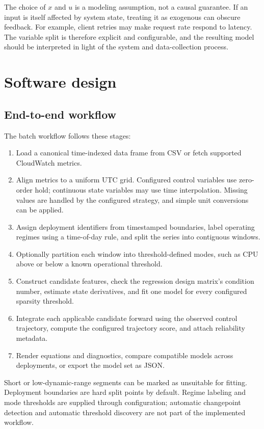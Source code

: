 \documentclass[11pt]{article}
\begin{document}
The choice of $x$ and $u$ is a modeling assumption, not a causal guarantee. If an input is itself affected by system state, treating it as exogenous can obscure feedback. For example, client retries may make request rate respond to latency. The variable split is therefore explicit and configurable, and the resulting model should be interpreted in light of the system and data-collection process.

\section{Software design}

\subsection{End-to-end workflow}

The batch workflow follows these stages:
\begin{enumerate}
  \item Load a canonical time-indexed data frame from CSV or fetch supported CloudWatch metrics.
  \item Align metrics to a uniform UTC grid. Configured control variables use zero-order hold; continuous state variables may use time interpolation. Missing values are handled by the configured strategy, and simple unit conversions can be applied.
  \item Assign deployment identifiers from timestamped boundaries, label operating regimes using a time-of-day rule, and split the series into contiguous windows.
  \item Optionally partition each window into threshold-defined modes, such as CPU above or below a known operational threshold.
  \item Construct candidate features, check the regression design matrix's condition number, estimate state derivatives, and fit one model for every configured sparsity threshold.
  \item Integrate each applicable candidate forward using the observed control trajectory, compute the configured trajectory score, and attach reliability metadata.
  \item Render equations and diagnostics, compare compatible models across deployments, or export the model set as JSON.
\end{enumerate}

Short or low-dynamic-range segments can be marked as unsuitable for fitting. Deployment boundaries are hard split points by default. Regime labeling and mode thresholds are supplied through configuration; automatic changepoint detection and automatic threshold discovery are not part of the implemented workflow.
\end{document}

